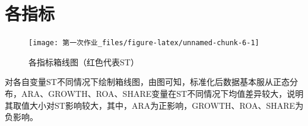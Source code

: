 \documentclass[
  hyperref,]{ctexart}
\begin{document}
\hypertarget{ux5404ux6307ux6807}{%
\section{各指标}\label{ux5404ux6307ux6807}}

\begin{figure}[H]

{\centering \texttt{[image: 第一次作业\_files/figure-latex/unnamed-chunk-6-1]} 

}

\caption{各指标箱线图（红色代表ST）}\label{fig:unnamed-chunk-6}
\end{figure}

对各自变量ST不同情况下绘制箱线图，由图可知，标准化后数据基本服从正态分布，ARA、GROWTH、ROA、SHARE变量在ST不同情况下均值差异较大，说明其取值大小对ST影响较大，其中，ARA为正影响，GROWTH、ROA、SHARE为负影响。
\end{document}
